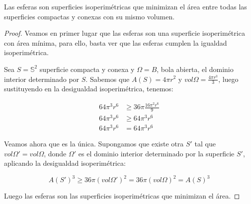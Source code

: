 \begin{proposition}
Las esferas son superficies isoperimétricas que minimizan el área entre todas las superficies compactas y conexas con su mismo volumen.
\end{proposition}
\begin{proof}
Veamos en primer lugar que las esferas son una superficie isoperimétrica con área mínima, para ello, basta ver que las esferas cumplen la igualdad isoperimétrica.

Sea $S=\mathbb{S}^2$ superficie compacta y conexa y $\Omega = B$, bola abierta, el dominio interior determinado por $S$. Sabemos que $A(S)=4\pi r^2$ y $vol \Omega = \frac{4\pi r^3}{3}$, luego sustituyendo en la desigualdad isoperimétrica, tenemos:

\begin{align*}
    64 \pi^3 r^6 &\geq 36\pi \frac{16\pi^2r^6}{9} \\
    64 \pi^3 r^6 &\geq 64\pi^3r^6 \\
    64 \pi^3 r^6 &= 64\pi^3r^6
\end{align*}

Veamos ahora que es la única. Supongamos que existe otra $S'$ tal que $vol \Omega' = vol \Omega$, donde $\Omega'$ es el dominio interior determinado por la superficie $S'$, aplicando la desigualdad isoperimétrica:

\begin{equation*}
    A(S')^3 \geq 36\pi (vol \Omega')^2 = 36\pi (vol \Omega)^2 = A(S)^3 
\end{equation*}

Luego las esferas son las superficies isoperimétricas que minimizan el área.
\end{proof}

